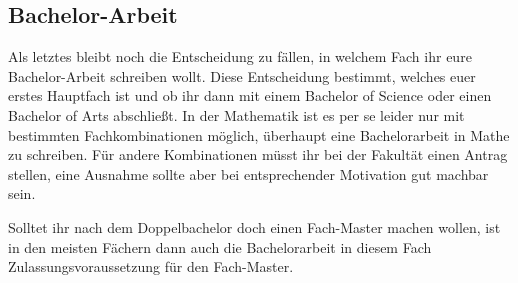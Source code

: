 \subsection{Bachelor-Arbeit}

Als letztes bleibt noch die Entscheidung zu fällen, in welchem Fach ihr eure Bachelor-Arbeit schreiben wollt. Diese Entscheidung bestimmt, welches euer erstes Hauptfach ist und ob ihr dann mit einem Bachelor of Science oder einen Bachelor of Arts abschließt. In der Mathematik ist es per se leider nur mit bestimmten Fachkombinationen möglich, überhaupt eine Bachelorarbeit in Mathe zu schreiben. Für andere Kombinationen müsst ihr bei der Fakultät einen Antrag stellen, eine Ausnahme sollte aber bei entsprechender Motivation gut machbar sein.

Solltet ihr nach dem Doppelbachelor doch einen Fach-Master machen wollen, ist in den meisten Fächern dann auch die Bachelorarbeit in diesem Fach Zulassungsvoraussetzung für den Fach-Master.

